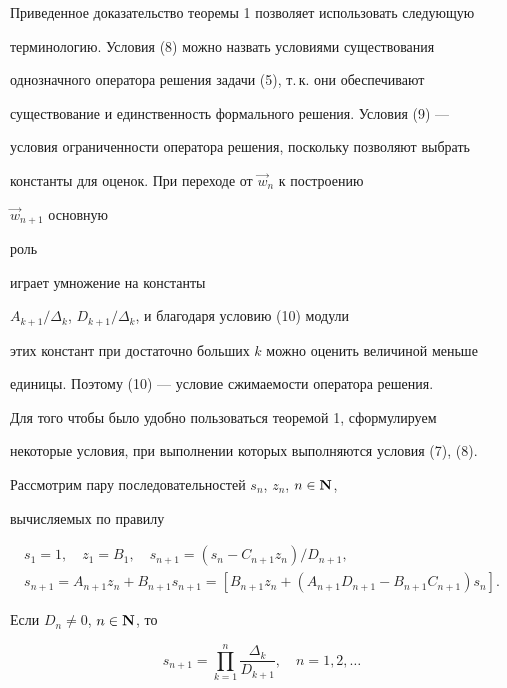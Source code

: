 Приведенное доказательство теоремы 1 позволяет использовать следующую


терминологию. Условия (8) можно назвать условиями существования


однозначного оператора решения задачи (5), т.\,к. они обеспечивают


существование и единственность формального решения. Условия (9) ---


условия ограниченности оператора решения, поскольку позволяют выбрать


константы для оценок. При переходе от $\Vec w_n$ к построению


$\Vec w_{n+1}$ основную


роль


играет умножение на константы


$A_{k+1}/\Delta_k$, $D_{k+1}/\Delta_k$, и благодаря условию (10) модули


этих констант при достаточно больших $k$ можно оценить величиной меньше


единицы. Поэтому (10) --- условие сжимаемости оператора решения.





Для того чтобы было удобно пользоваться теоремой 1, сформулируем


некоторые условия, при выполнении которых выполняются условия (7), (8).


Рассмотрим пару последовательностей $s_n$, $z_n$, $n\in\bold N$,


вычисляемых по правилу


\begin{gather*}


s_1=1,\quad z_1=B_1,\quad s_{n+1}=(s_n-C_{n+1}z_n)/D_{n+1},\\


s_{n+1}=A_{n+1}z_n+B_{n+1}s_{n+1}=


[B_{n+1}z_n+(A_{n+1}D_{n+1}-B_{n+1}C_{n+1})s_n].


\end{gather*}





\begin{lem}


Если $D_n\ne 0$, $n\in\bold N$, то


\begin{equation}


s_{n+1}=\prod^n_{k=1}\frac{\Delta_k}{D_{k+1}},\quad n=1,2,\dotsc


\end{equation}


\end{lem}





